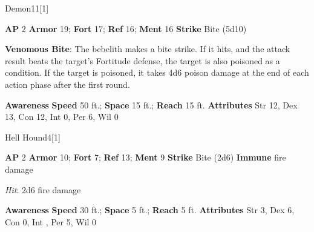 \begin{monsection}[Bebelith]{Demon}{11}[1]
\vspace{-1em}\vspace{-1em}
\begin{spellcontent}
\begin{spelltargetinginfo}
{\textbf{AP} 2}
\pari \textbf{Armor} 19;
\textbf{Fort} 17;
\textbf{Ref} 16;
\textbf{Ment} 16
\pari \textbf{Strike} Bite  (5d10)
\end{spelltargetinginfo}
\begin{spelleffects}
\pari
\textbf{Venomous Bite}:
The bebelith makes a bite strike.
If it hits, and the attack result beats the target's Fortitude defense, the target is also poisoned as a condition.
If the target is poisoned, it takes 4d6 poison damage at the end of each action phase after the first round.
\end{spelleffects}
\end{spellcontent}
\begin{spellsubcontent}
\begin{spellfooter}
\pari \textbf{Awareness} 
\pari \textbf{Speed} 50 ft.;
\textbf{Space} 15 ft.;
\textbf{Reach} 15 ft.
\pari \textbf{Attributes}
Str 12,
Dex 13,
Con 12,
Int 0,
Per 6,
Wil 0
\end{spellfooter}
\end{spellsubcontent}
\end{monsection}
\begin{monsection}{Hell Hound}{4}[1]
\vspace{-1em}\vspace{-1em}
\begin{spellcontent}
\begin{spelltargetinginfo}
{\textbf{AP} 2}
\pari \textbf{Armor} 10;
\textbf{Fort} 7;
\textbf{Ref} 13;
\textbf{Ment} 9
\pari \textbf{Strike} Bite  (2d6)
\pari \textbf{Immune} fire damage
\end{spelltargetinginfo}
\begin{spelleffects}
\pari
{}
\par
\par \textit{Hit}: 2d6 fire damage
\end{spelleffects}
\end{spellcontent}
\begin{spellsubcontent}
\begin{spellfooter}
\pari \textbf{Awareness} 
\pari \textbf{Speed} 30 ft.;
\textbf{Space} 5 ft.;
\textbf{Reach} 5 ft.
\pari \textbf{Attributes}
Str 3,
Dex 6,
Con 0,
Int ,
Per 5,
Wil 0
\end{spellfooter}
\end{spellsubcontent}
\end{monsection}
